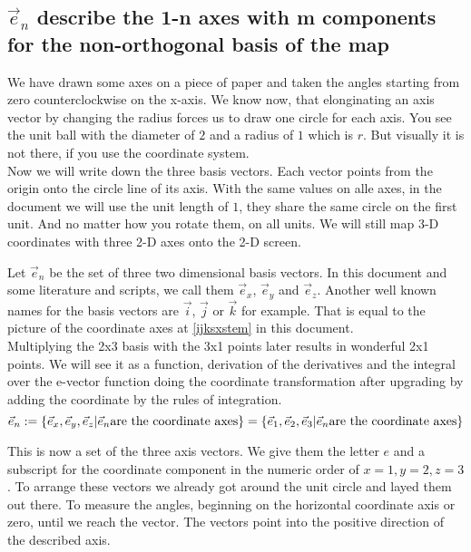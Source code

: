 \documentclass[a4paper]{article}
\begin{document}

\subsection{$\vec{e}_{n}$ describe the 1-n axes with m components for the non-orthogonal basis of the map}

We have drawn some axes on a piece of paper and taken the angles starting from zero counterclockwise on the x-axis.
We know now, that elonginating an axis vector by changing the radius forces us to draw one circle for each axis. You see the
unit ball with the diameter of $2$ and a radius of $1$ which is $r$. But visually it is not there, if you use the coordinate system.\\

Now we will write down the three basis vectors. Each vector points from the origin onto the circle line of its axis. With the same
values on alle axes, in the document we will use the unit length of $1$, they share the same circle on the first unit. And no matter how you rotate them, on all units. We will still map 3-D coordinates with three 2-D axes onto the 2-D screen.

Let $\vec{e}_{n}$ be the set of three two dimensional basis vectors. In this document and some literature and scripts,
we call them $\vec{e}_x$, $\vec{e}_y$ and $\vec{e}_z$. Another well known names for the basis vectors are $\vec{i}$, 
$\vec{j}$ or $\vec{k}$ for example. That is equal to the picture of the coordinate axes at \ref{ijksxstem} in this document.\\

Multiplying the 2x3 basis with the 3x1 points later results in wonderful 2x1 points. We will see it as a function, derivation of the derivatives and the integral over the e-vector function doing the coordinate transformation after upgrading by adding the coordinate by the rules of integration.\\

\begin{displaymath}
\vec{e}_{n} := \{\vec{e}_x, \vec{e}_y, \vec{e}_z | \vec{e}_{n} \mbox{are the coordinate axes} \} = \{\vec{e}_1, \vec{e}_2, \vec{e}_3  | \vec{e}_{n} \mbox{are the coordinate axes} \}\\
\end{displaymath} 

This is now a set of the three axis vectors. We give them the letter $e$ and a subscript for the coordinate component in the numeric order of $x=1, y=2, z=3$. To arrange these vectors we already got around the unit circle and layed them out there. To measure the angles, beginning on the horizontal coordinate axis or zero, until we reach the vector. The vectors point into the positive direction of the described axis.\\
\end{document}
